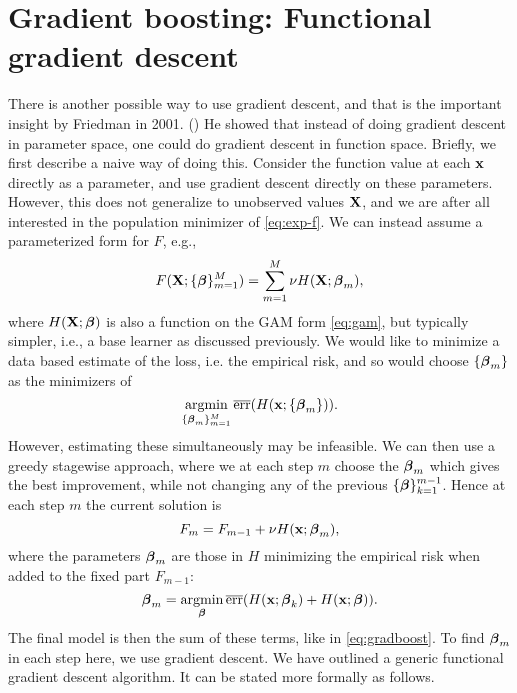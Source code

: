 \section{Gradient boosting: Functional gradient descent}
There is another possible way to use gradient descent, and that is the important insight by Friedman in 2001. (\cite{friedman2001}) He showed that instead of doing gradient descent in parameter space, one could do gradient descent in function space. Briefly, we first describe a naive way of doing this. Consider the function value at each $\mathbf{x}$ directly as a parameter, and use gradient descent directly on these parameters. However, this does not generalize to unobserved values $\mathbf{X}$, and we are after all interested in the population minimizer of \eqref{eq:exp-f}. We can instead assume a parameterized form for $F$, e.g.,
\begin{equation}\label{eq:gradboost}
    F(\mathbf{X};\{\boldsymbol{\beta}\}_{m=1}^M)=\sum_{m=1}^M\nu H(\mathbf{X};\boldsymbol{\beta}_m),
\end{equation}
where $H(\mathbf{X};\boldsymbol{\beta})$ is also a function on the GAM form \eqref{eq:gam}, but typically simpler, i.e., a base learner as discussed previously. We would like to minimize a data based estimate of the loss, i.e. the empirical risk, and so would choose $\{\boldsymbol{\beta}_m\}$ as the minimizers of 
\begin{equation*}
    \operatorname*{argmin}_{\{\boldsymbol{\beta}_m\}_{m=1}^M}\overline{\text{err}}(H(\mathbf{x};\{\boldsymbol{\beta}_m\})).
\end{equation*}
However, estimating these simultaneously may be infeasible. We can then use a greedy stagewise approach, where we at each step $m$ choose the $\boldsymbol{\beta}_m$ which gives the best improvement, while not changing any of the previous $\{\boldsymbol{\beta}\}_{k=1}^{m-1}$. Hence at each step $m$ the current solution is
\begin{equation*}
    F_{m}=F_{m-1}+\nu H(\mathbf{x};\boldsymbol{\beta}_m),
\end{equation*}
where the parameters $\boldsymbol{\beta}_m$ are those in $H$ minimizing the empirical risk when added to the fixed part $F_{m-1}$:
\begin{equation*}
    \boldsymbol{\beta}_m=\operatorname*{argmin}_{\boldsymbol{\beta}}\overline{\text{err}}(H(\mathbf{x};\boldsymbol{\beta}_k)+H(\mathbf{x};\boldsymbol{\beta})).
\end{equation*}
The final model is then the sum of these terms, like in \eqref{eq:gradboost}. To find $\boldsymbol{\beta}_m$ in each step here, we use gradient descent. We have outlined a generic functional gradient descent algorithm. It can be stated more formally as follows.
